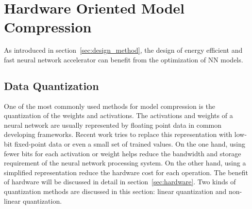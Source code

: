 \section{Hardware Oriented Model Compression}\label{sec:software}

As introduced in section~\ref{sec:design_method}, the design of energy efficient and fast neural network accelerator can benefit from the optimization of NN models. 

\subsection{Data Quantization}\label{sec:software:quant}
One of the most commonly used methods for model compression is the quantization of the weights and activations. The activations and weights of a neural network are usually represented by floating point data in common developing frameworks. Recent work tries to replace this representation with low-bit fixed-point data or even a small set of trained values. On the one hand, using fewer bits for each activation or weight helps reduce the bandwidth and storage requirement of the neural network processing system. On the other hand, using a simplified representation reduce the hardware cost for each operation. The benefit of hardware will be discussed in detail in section~\ref{sec:hardware}. Two kinds of quantization methods are discussed in this section: linear quantization and non-linear quantization.

